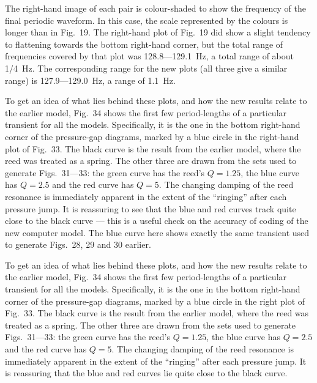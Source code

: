





  The right-hand image of each pair is colour-shaded to show the frequency of 
  the final periodic waveform. In this case, the scale represented by the 
  colours is longer than in Fig.\ 19. The right-hand plot of Fig.\ 19 did show 
  a slight tendency to flattening towards the bottom right-hand corner, but the 
  total range of frequencies covered by that plot was 128.8—129.1~Hz, a total 
  range of about 1/4~Hz. The corresponding range for the new plots (all three 
  give a similar range) is 127.9—129.0~Hz, a range of 1.1~Hz. 

  To get an idea of what lies behind these plots, and how the new results 
  relate to the earlier model, Fig.\ 34 shows the first few period-lengths of a 
  particular transient for all the models. Specifically, it is the one in the 
  bottom right-hand corner of the pressure-gap diagrams, marked by a blue 
  circle in the right-hand plot of Fig.\ 33. The black curve is the result from 
  the earlier model, where the reed was treated as a spring. The other three 
  are drawn from the sets used to generate Figs.\ 31—33: the green curve has 
  the reed’s $Q=1.25$, the blue curve has $Q=2.5$ and the red curve has $Q=5$. 
  The changing damping of the reed resonance is immediately apparent in the 
  extent of the “ringing” after each pressure jump. It is reassuring to see 
  that the blue and red curves track quite close to the black curve --- this is 
  a useful check on the accuracy of coding of the new computer model. The blue 
  curve here shows exactly the same transient used to generate Figs.\ 28, 29 
  and 30 earlier. 

  To get an idea of what lies behind these plots, and how the new results 
  relate to the earlier model, Fig.\ 34 shows the first few period-lengths of a 
  particular transient for all the models. Specifically, it is the one in the 
  bottom right-hand corner of the pressure-gap diagrams, marked by a blue 
  circle in the right plot of Fig.\ 33. The black curve is the result from the 
  earlier model, where the reed was treated as a spring. The other three are 
  drawn from the sets used to generate Figs.\ 31—33: the green curve has the 
  reed’s $Q=1.25$, the blue curve has $Q=2.5$ and the red curve has $Q=5$. The 
  changing damping of the reed resonance is immediately apparent in the extent 
  of the “ringing” after each pressure jump. It is reassuring that the blue and 
  red curves lie quite close to the black curve. 

